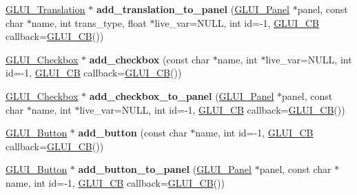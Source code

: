 \begin{DoxyCompactItemize}
\item 
\hypertarget{classGLUI_af1b40b8b22311afaba99862940006c2a}{\hyperlink{classGLUI__Translation}{G\-L\-U\-I\-\_\-\-Translation} $\ast$ {\bfseries add\-\_\-translation\-\_\-to\-\_\-panel} (\hyperlink{classGLUI__Panel}{G\-L\-U\-I\-\_\-\-Panel} $\ast$panel, const char $\ast$name, int trans\-\_\-type, float $\ast$live\-\_\-var=N\-U\-L\-L, int id=-\/1, \hyperlink{classGLUI__CB}{G\-L\-U\-I\-\_\-\-C\-B} callback=\hyperlink{classGLUI__CB}{G\-L\-U\-I\-\_\-\-C\-B}())}\label{classGLUI_af1b40b8b22311afaba99862940006c2a}

\item 
\hypertarget{classGLUI_abe2e9677a544d37485e1913a143d7ef7}{\hyperlink{classGLUI__Checkbox}{G\-L\-U\-I\-\_\-\-Checkbox} $\ast$ {\bfseries add\-\_\-checkbox} (const char $\ast$name, int $\ast$live\-\_\-var=N\-U\-L\-L, int id=-\/1, \hyperlink{classGLUI__CB}{G\-L\-U\-I\-\_\-\-C\-B} callback=\hyperlink{classGLUI__CB}{G\-L\-U\-I\-\_\-\-C\-B}())}\label{classGLUI_abe2e9677a544d37485e1913a143d7ef7}

\item 
\hypertarget{classGLUI_aec624d071e0f7eedce5946a68d331949}{\hyperlink{classGLUI__Checkbox}{G\-L\-U\-I\-\_\-\-Checkbox} $\ast$ {\bfseries add\-\_\-checkbox\-\_\-to\-\_\-panel} (\hyperlink{classGLUI__Panel}{G\-L\-U\-I\-\_\-\-Panel} $\ast$panel, const char $\ast$name, int $\ast$live\-\_\-var=N\-U\-L\-L, int id=-\/1, \hyperlink{classGLUI__CB}{G\-L\-U\-I\-\_\-\-C\-B} callback=\hyperlink{classGLUI__CB}{G\-L\-U\-I\-\_\-\-C\-B}())}\label{classGLUI_aec624d071e0f7eedce5946a68d331949}

\item 
\hypertarget{classGLUI_a7a0e923887d735fd03756dadcec8a019}{\hyperlink{classGLUI__Button}{G\-L\-U\-I\-\_\-\-Button} $\ast$ {\bfseries add\-\_\-button} (const char $\ast$name, int id=-\/1, \hyperlink{classGLUI__CB}{G\-L\-U\-I\-\_\-\-C\-B} callback=\hyperlink{classGLUI__CB}{G\-L\-U\-I\-\_\-\-C\-B}())}\label{classGLUI_a7a0e923887d735fd03756dadcec8a019}

\item 
\hypertarget{classGLUI_a086abe4cee5ba0f619d36f5aed8aac75}{\hyperlink{classGLUI__Button}{G\-L\-U\-I\-\_\-\-Button} $\ast$ {\bfseries add\-\_\-button\-\_\-to\-\_\-panel} (\hyperlink{classGLUI__Panel}{G\-L\-U\-I\-\_\-\-Panel} $\ast$panel, const char $\ast$name, int id=-\/1, \hyperlink{classGLUI__CB}{G\-L\-U\-I\-\_\-\-C\-B} callback=\hyperlink{classGLUI__CB}{G\-L\-U\-I\-\_\-\-C\-B}())}\label{classGLUI_a086abe4cee5ba0f619d36f5aed8aac75}


\end{DoxyCompactItemize}

